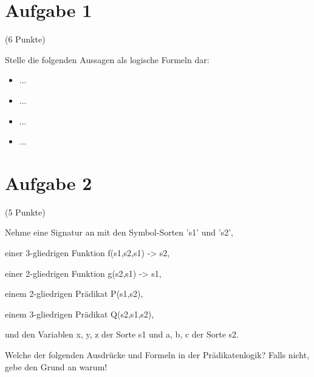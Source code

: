 \documentclass{exam}
\author{Valentin Richter}
\newcommand{\Punkte}[1]{\begin{flushright}(#1 Punkte)\end{flushright}}
\begin{document}
	
	
	\section{Aufgabe 1}
		
	\Punkte{6}
	
	Stelle die folgenden Aussagen als logische Formeln dar:
	
	\begin{itemize}
		
		\item ...
		\item ...
		\item ...
		\item ...
		
	\end{itemize}
	
	
	\clearpage
	\section{Aufgabe 2}
	
	\Punkte{5}
	
	Nehme eine Signatur an mit den Symbol-Sorten 's1' und 's2',
	
	einer 3-gliedrigen Funktion f(s1,s2,s1) -> s2,
	
	einer 2-gliedrigen Funktion g(s2,s1) -> s1,
	
	einem 2-gliedrigen Prädikat P(s1,s2),
	
	einem 3-gliedrigen Prädikat Q(s2,s1,s2),
	
	und den Variablen x, y, z der Sorte s1 und a, b, c der Sorte s2.
	
	Welche der folgenden Ausdrücke und Formeln in der Prädikatenlogik? Falls nicht, gebe den Grund an warum!
	
\end{document}
